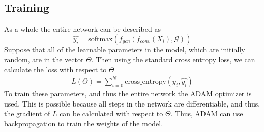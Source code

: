 \subsection{Training}
As a whole the entire network can be described as
\[
    \hat{y_i} = \text{softmax}(f_{gcn}(f_{conv}(X_i), \mathcal{G}))
\]
Suppose that all of the learnable parameters in the model, which are initially random, are in the vector $\Theta$. Then using the standard cross entropy loss, we can calculate the loss with respect to $\Theta$
\begin{align*}
    L(\Theta) = \sum_{i=0}^N \text{cross\_entropy}(y_i, \hat{y_i})
\end{align*}
To train these parameters, and thus the entire network the ADAM optimizer is used. This is possible because all steps in the network are differentiable, and thus, the gradient of $L$ can be calculated with respect to $\Theta$. Thus, ADAM can use backpropagation to train the weights of the model.